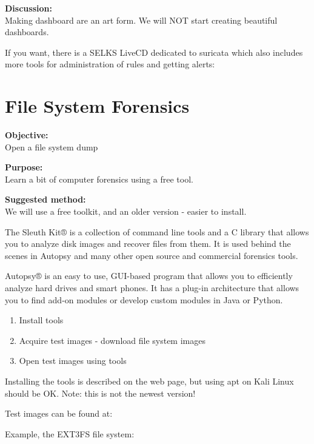 \documentclass[a4paper,11pt,notitlepage]{report}
\begin{document}
{\bf Discussion:}\\
Making dashboard are an art form. We will NOT start creating beautiful dashboards.

If you want, there is a SELKS LiveCD dedicated to suricata which also includes more tools for administration of rules and getting alerts:\\


\chapter{File System Forensics}
\label{ex:file-system-forensics}

{\bf Objective:}\\
 Open a file system dump

{\bf Purpose:}\\
Learn a bit of computer forensics using a free tool.

{\bf Suggested method:}\\
We will use a free toolkit, and an older version - easier to install.

The Sleuth Kit® is a collection of command line tools and a C library that allows you to analyze disk images and recover files from them. It is used behind the scenes in Autopsy and many other open source and commercial forensics tools.

Autopsy® is an easy to use, GUI-based program that allows you to efficiently analyze hard drives and smart phones. It has a plug-in architecture that allows you to find add-on modules or develop custom modules in Java or Python.



\begin{enumerate}
\item Install tools
\item Acquire test images - download file system images
\item Open test images using tools
\end{enumerate}

Installing the tools is described on the web page, but using apt on Kali Linux should be OK. Note: this is not the newest version!

Test images can be found at:\\

Example, the EXT3FS file system:\\
\end{document}
